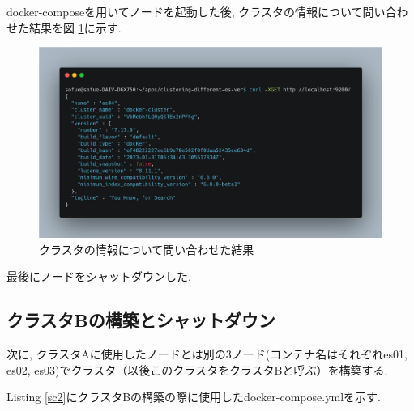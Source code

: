 \documentclass[a4j,12pt,]{jarticle}
\begin{document}
docker-composeを用いてノードを起動した後, クラスタの情報について問い合わせた結果を図 \ref{p1-1}に示す.

\begin{figure}[H]
  \begin{center}
    \includegraphics[width=160mm]{es04-cluster.png}
    \caption{クラスタの情報について問い合わせた結果}
    \label{p1-1}
  \end{center}
\end{figure}

最後にノードをシャットダウンした.

\subsection{クラスタBの構築とシャットダウン}

次に, クラスタAに使用したノードとは別の3ノード(コンテナ名はそれぞれes01, es02, es03)でクラスタ（以後このクラスタをクラスタBと呼ぶ）を構築する.

Listing \ref{sc2}にクラスタBの構築の際に使用したdocker-compose.ymlを示す.

\end{document}
